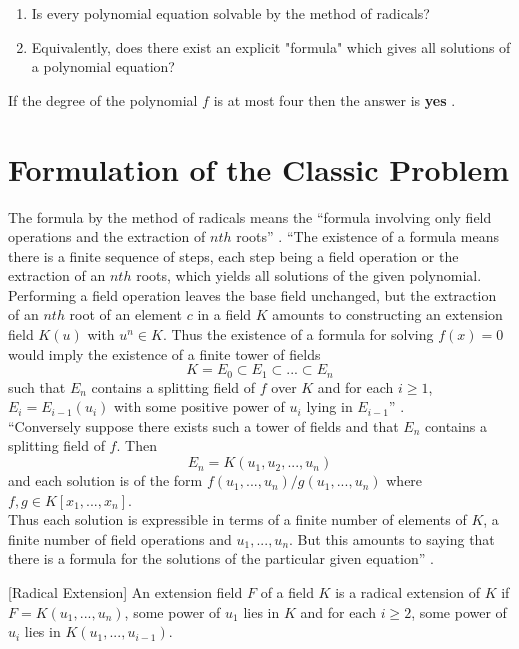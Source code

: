 \begin{enumerate}
\item Is every polynomial equation solvable by the method of radicals?
\item Equivalently, does there exist an explicit "formula" which gives all solutions of a polynomial equation?
\end{enumerate}

If the degree of  the polynomial \(f\) is at most four then the answer is \textbf{yes} \cite{hunger}.

\section{Formulation of the Classic Problem}
The formula by the method of radicals means the ``formula involving only field operations and the extraction of \(nth\) roots'' \cite{hunger}.
``The existence of a formula means there is a finite sequence of steps, each step being a field operation or the extraction of an \(nth\) roots, which yields all solutions of the given polynomial.
Performing a field operation leaves the base field unchanged, but the extraction of an \(nth\) root of an element
\(c\) in a field \(K\) amounts to constructing an extension field \(K(u)\) with \(u^n \in K\). Thus the existence of a formula for solving \(f(x)=0\) would imply
the existence of a finite tower of fields
\[K=E_0 \subset E_1 \subset ... \subset E_n\]
such that \(E_n\) contains a splitting field of \(f\) over \(K\) and for each \(i \geq 1\), \(E_i=E_{i-1}(u_i)\) with some positive power of \(u_i\) lying in \(E_{i-1}\)'' \cite{hunger}.\\
``Conversely suppose there exists such a tower of fields and that \(E_n\) contains a splitting field of \(f\). Then
\[E_n = K(u_1,u_2,...,u_n)\]
and each solution is of the form \(f(u_1,...,u_n)/g(u_1,...,u_n)\) where \(f,g \in K[x_1,...,x_n]\). \\
Thus each solution is expressible in terms of a finite number of elements of \(K\), a finite number of field operations and \(u_1,...,u_n\). But
this amounts to saying that there is a formula for the solutions of the particular given equation'' \cite{hunger}.
\vspace{3mm}

\begin{definition} \cite{hunger} [Radical Extension]
An extension field \(F\) of a field \(K\) is a radical extension of \(K\) if \(F=K(u_1,...,u_n)\), some power of \(u_1\) lies in \(K\) and for each \(i \geq 2\), some power of \(u_i\) lies in \(K(u_1,...,u_{i-1})\).
\end{definition}

